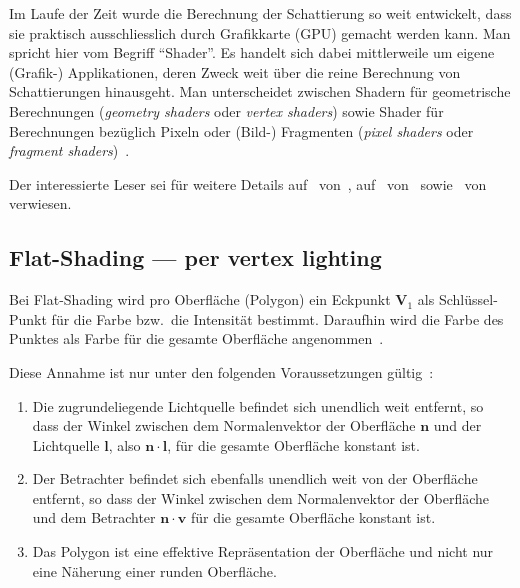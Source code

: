 Im Laufe der Zeit wurde die Berechnung der Schattierung so weit
entwickelt, dass sie praktisch ausschliesslich durch Grafikkarte (GPU)
gemacht werden kann.  Man spricht hier vom Begriff ``Shader''. Es
handelt sich dabei mittlerweile um eigene (Grafik-) Applikationen, deren
Zweck weit über die reine Berechnung von Schattierungen hinausgeht. Man
unterscheidet zwischen Shadern für geometrische Berechnungen
(\textit{geometry shaders} oder \textit{vertex shaders}) sowie Shader
für Berechnungen bezüglich Pixeln  oder (Bild-) Fragmenten
(\textit{pixel shaders} oder \textit{fragment
shaders})~\parencite[Kapitel 33]{hughes_computer_2013}.

Der interessierte Leser sei für weitere Details auf~ von~\cite{hughes_computer_2013},
auf~
von~\cite{opengl_foundation_rendering_2015}
sowie~ von~\cite{fernando_cg_2003}
verwiesen.

\subsection{Flat-Shading --- per vertex lighting}
\label{subsec:flat_shading}


Bei Flat-Shading wird pro Oberfläche (Polygon) ein Eckpunkt $\bm{V}_{1}$
als Schlüssel-Punkt für die Farbe bzw.\ die Intensität bestimmt.
Daraufhin wird die Farbe des Punktes als Farbe für die gesamte
Oberfläche angenommen~\parencite[S. 734]{foley_computer_1996}.

Diese Annahme ist nur unter den folgenden Voraussetzungen gültig~\parencite[S. 734]{foley_computer_1996}:
\begin{enumerate}
    \item{Die zugrundeliegende Lichtquelle befindet sich unendlich weit
            entfernt, so dass der Winkel zwischen dem Normalenvektor der
            Oberfläche $\bm{n}$ und der Lichtquelle $\bm{l}$, also
            $\bm{n}\cdot{}\bm{l}$, für die gesamte Oberfläche konstant
            ist.}
    \item{Der Betrachter befindet sich ebenfalls unendlich weit von der
        Oberfläche entfernt, so dass der Winkel zwischen dem
        Normalenvektor der Oberfläche und dem Betrachter
        $\bm{n}\cdot{}\bm{v}$ für die gesamte Oberfläche konstant ist.}
    \item{Das Polygon ist eine effektive Repräsentation der Oberfläche
            und nicht nur eine Näherung einer runden Oberfläche.}
\end{enumerate}


